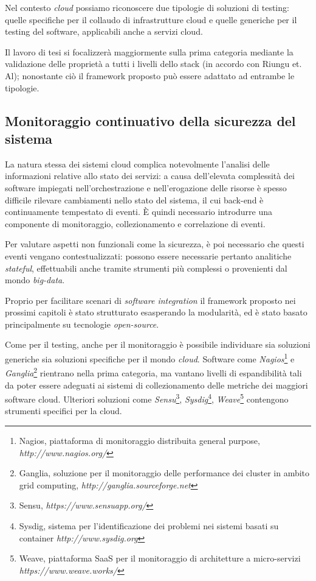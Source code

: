 \documentclass[../main.tex]{subfiles}
\begin{document}
Nel contesto \textit{cloud} possiamo riconoscere due tipologie di soluzioni di testing: quelle specifiche per il collaudo di infrastrutture cloud e quelle generiche per il testing del software, applicabili anche a servizi cloud.


Il lavoro di tesi si focalizzerà maggiormente sulla prima categoria mediante la validazione delle proprietà a tutti i livelli dello stack (in accordo con Riungu et. Al\cite{Ieee5708500}); nonostante ciò il framework proposto può essere adattato ad entrambe le tipologie.


\subsection{Monitoraggio continuativo della sicurezza del sistema}
La natura stessa dei sistemi cloud complica notevolmente l'analisi delle informazioni relative allo stato dei servizi: a causa dell'elevata complessità dei software impiegati nell'orchestrazione e nell'erogazione delle risorse è spesso difficile rilevare cambiamenti nello stato del sistema, il cui back-end è continuamente tempestato di eventi.
È quindi necessario introdurre una componente di monitoraggio, collezionamento e correlazione di eventi.


Per valutare aspetti non funzionali come la sicurezza, è poi necessario che questi eventi vengano contestualizzati: possono essere necessarie pertanto analitiche \textit{stateful}, effettuabili anche tramite strumenti più complessi o provenienti dal mondo \textit{big-data}. 


Proprio per facilitare scenari di \textit{software integration} il framework proposto nei prossimi capitoli è stato strutturato esasperando la modularità, ed è stato basato principalmente su tecnologie \textit{open-source}.


Come per il testing, anche per il monitoraggio è possibile individuare sia soluzioni generiche sia soluzioni specifiche per il mondo \textit{cloud}. Software come \textit{Nagios}\footnote{Nagios, piattaforma di monitoraggio distribuita general purpose, \textit{http://www.nagios.org/}} e \textit{Ganglia}\footnote{Ganglia, soluzione per il monitoraggio delle performance dei cluster in ambito grid computing, \textit{http://ganglia.sourceforge.net}} rientrano nella prima categoria, ma vantano livelli di espandibilità tali da poter essere adeguati ai sistemi di collezionamento delle metriche dei maggiori software cloud.
Ulteriori soluzioni come \textit{Sensu}\footnote{Sensu, \textit{https://www.sensuapp.org/}}, \textit{Sysdig}\footnote{Sysdig, sistema per l'identificazione dei problemi nei sistemi basati su container \textit{http://www.sysdig.org}}, \textit{Weave}\footnote{Weave, piattaforma SaaS per il monitoraggio di architetture a micro-servizi \textit{https://www.weave.works/}} contengono strumenti specifici per la cloud.
\end{document}
